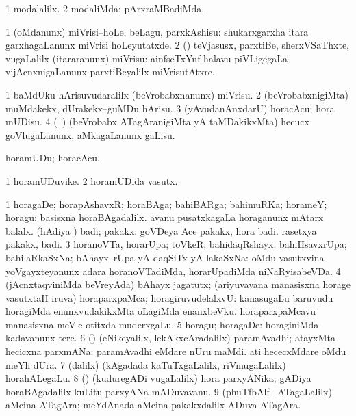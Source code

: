 \noindent
\gl{\pagu}
\bmng
\bnum
\num{1}  modalalilx. 
\num{2}  modaliMda; pArxraMBadiMda. 
\enum
\emng
\eentry

\bentry
{}
\gl{\sakirx}
\bmng
\bnum
\num{1} (oMdanunx) miVrisi--hoLe, beLagu, parxkAshisu:  shukarxgarxha itara garxhagaLanunx miVrisi hoLeyutatxde. 
\num{2} (\rUpa) teVjasusx, parxtiBe, sherxVSaThxte, \mo vugaLalilx (itararanunx) miVrisu:  ainfseTxYnf halavu piVLigegaLa vijAcnxnigaLanunx parxtiBeyalilx miVrisutAtxre. 
\enum
\emng
\eentry

\bentry
{}
\gl{\sakirx}
\bmng
\bnum
\num{1} baMdUku hArisuvudaralilx (beVrobabxnanunx) miVrisu. 
\num{2} (beVrobabxnigiMta) muMdakekx, dUrakekx--guMDu hArisu. 
\num{3} (yAvudanAnxdarU) horacAcu; hora mUDisu. 
\num{4} (\kanmu\ \ame) (beVrobabx ATagAranigiMta yA taMDakikxMta) hecucx goVlugaLanunx, aMkagaLanunx gaLisu. 
\enum
\emng

\noindent
\gl{\akirx}
\bmng
horamUDu; horacAcu. 
\emng
\eentry

\bentry
{}
\gl{\nA}
\bmng
\bnum
\num{1} horamUDuvike. 
\num{2} horamUDida vasutx. 
\enum
\emng
\eentry

\bentry
{}
\gl{\nA}
\bmng
\bnum
\num{1} horagaDe; horapAshavxR; horaBAga; bahiBARga; bahimuRKa; horameY; horagu:  basisxna horaBAgadalilx.  avanu pusatxkagaLa horaganunx mAtarx balalx. 
 (hAdiya \vi) badi; pakakx: 
\banum
{} goVDeya Ace pakakx, hora badi. 
 rasetxya pakakx, badi. 
\eanum
\numie
\num{3} horanoVTa, horarUpa; toVkeR; bahidaqRshayx; bahiHsavxrUpa; bahilaRkaSxNa; bAhayx--rUpa yA daqSiTx yA lakaSxNa:  oMdu vasutxvina yoVgayxteyanunx adara horanoVTadiMda, horarUpadiMda niNaRyisabeVDa. 
\num{4} (jAcnxtaqviniMda beVreyAda) bAhayx jagatutx; (ariyuvavana manasisxna horage vasutxtaH iruva) horaparxpaMca; horagiruvudelalxvU:  kanasugaLu baruvudu horagiMda enunxvudakikxMta oLagiMda enanxbeVku.  horaparxpaMcavu manasisxna meVle otitxda muderxgaLu. 
\num{5} horagu; horagaDe:  horaginiMda kadavanunx tere. 
\num{6} (\AmA) (eNikeyalilx, lekAkxcAradalilx) paramAvadhi; atayxMta hecicxna parxmANa:  paramAvadhi eMdare nUru maMdi.  ati hececxMdare oMdu meYli dUra. 
\num{7} (\bava dalilx) (kAgadada kaTuTxgaLalilx, riVmugaLalilx) horahALegaLu. 
\num{8} (\birx) (kuduregADi \mo vugaLalilx) hora parxyANika; gADiya horaBAgadalilx kuLitu parxyANa mADuvavanu. 
\num{9} (phuTfbAlf \mo\ ATagaLalilx) aMcina ATagAra; meYdAnada aMcina pakakxdalilx ADuva ATagAra. 
\enum
\emng
\eentry

